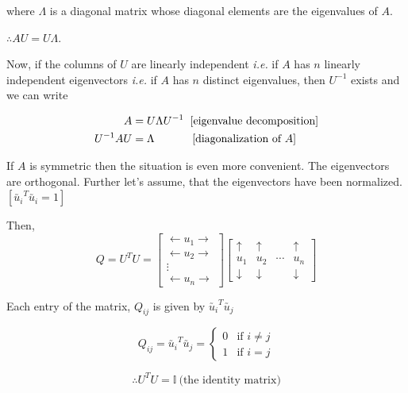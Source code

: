 \documentclass[11pt, a4paper]{article}
\begin{document}
where $\Lambda$ is a diagonal matrix whose diagonal elements are the eigenvalues of $A$. \\

\vspace{0.3cm}

$\therefore AU = U\Lambda$. \\

\vspace{0.3cm}

Now, if the columns of $U$ are linearly independent \textit{i.e.} if $A$ has $n$ linearly independent eigenvectors \textit{i.e.} if $A$ has $n$ distinct eigenvalues, then $U^{-1}$ exists and we can write

\begin{align*}
A &= U \Lambda U^{-1} \hspace{0.2cm} \text{[eigenvalue decomposition]} \\
U^{-1} A U &= \Lambda \hspace{1.2cm} \text{[diagonalization of } A]
\end{align*}

\newpage

If $A$ is symmetric then the situation is even more convenient. The eigenvectors are orthogonal. Further let's assume, that the eigenvectors have been normalized. $\left[ \utilde{u_i}^T \utilde{u_i} = 1 \right]$

Then,
\[
Q = U^T U =
\begin{bmatrix}
\leftarrow u_1 \rightarrow \\
\leftarrow u_2 \rightarrow \\
\vdots \\
\leftarrow u_n \rightarrow
\end{bmatrix}
\begin{bmatrix}
\uparrow & \uparrow & & \uparrow \\
u_1 & u_2 & \cdots & u_n \\
\downarrow & \downarrow & & \downarrow
\end{bmatrix}
\]

Each entry of the matrix, $Q_{ij}$ is given by $\utilde{u_i}^T \utilde{u_j}$

\[
Q_{ij} = \utilde{u_i}^T \utilde{u_j} =
\begin{cases}
0 & \text{if } i \neq j \\
1 & \text{if } i = j
\end{cases}
\]

\[
\therefore U^T U = \mathbb{I} \ \text{(the identity matrix)}
\]
\end{document}
